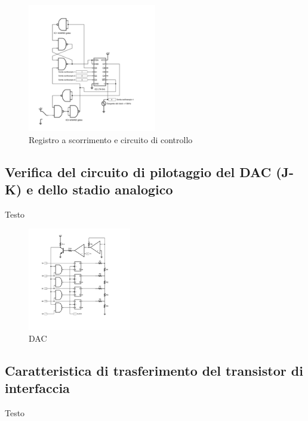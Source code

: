 \documentclass[journal]{IEEEtran}
\begin{document}
\begin{figure}[H]%
\begin{center}
\includegraphics[width=0.50\textwidth]{sch-simulations/digital/output/shift-register.pdf}
\caption{Registro a scorrimento e circuito di controllo}
\label{fig:circuit_shift_register}
\end{center}
\end{figure}



\subsection{Verifica del circuito di pilotaggio del DAC (J-K) e dello stadio analogico}
Testo

\begin{figure}[H]%
\begin{center}
\includegraphics[width=0.40\textwidth]{sch-simulations/digital/output/DAC.pdf}
\caption{DAC}
\label{fig:circuit_DAC}
\end{center}
\end{figure}

\subsection{Caratteristica di trasferimento del transistor di interfaccia}
Testo
\end{document}

